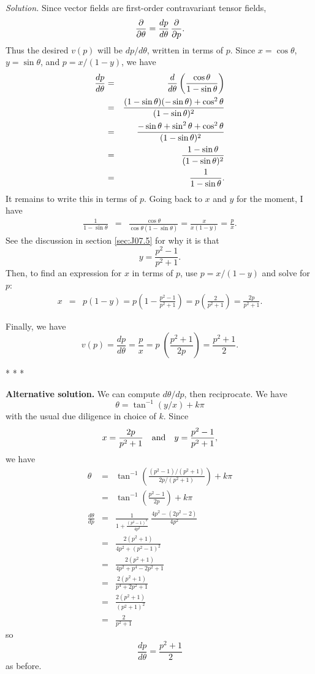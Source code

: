 \documentclass[10pt]{article}
\numberwithin{equation}{subsection}
\begin{document}
\emph{Solution.}  Since vector fields are first-order contravariant tensor
fields,
$$
	\frac{\partial}{\partial \theta} = \frac{dp}{d\theta} \, \frac{\partial}{\partial p}.
$$
Thus the desired $v(p)$ will be $dp/d\theta$, written in terms of $p$.
Since $x=\cos\theta$, $y=\sin\theta$, and $p=x/(1-y)$, we have
\begin{eqnarray*}
	\frac{dp}{d\theta}
	&=& \frac{d}{d\theta}\left(\frac{\cos\theta}{1-\sin\theta}\right) \\
	&=& \frac{(1-\sin\theta)(-\sin\theta) + \cos^2\theta}{(1-\sin\theta)^2} \\
	&=& \frac{-\sin\theta + \sin^2\theta + \cos^2\theta}{(1-\sin\theta)^2} \\
	&=& \frac{1-\sin\theta}{(1-\sin\theta)^2} \\
	&=& \frac{1}{1-\sin\theta}.
\end{eqnarray*}
It remains to write this in terms of $p$.  Going back to $x$ and $y$ for
the moment, I have
\begin{eqnarray*}
	\frac{1}{1-\sin\theta}
	&=& \frac{\cos\theta}{\cos\theta(1-\sin\theta)}
	= \frac{x}{x(1-y)}
	= \frac{p}{x}.
\end{eqnarray*}
See the discussion in section \ref{sec:J07.5} for why it is that
$$
	y = \frac{p^2-1}{p^2+1}.
$$
Then, to find an expression for $x$ in terms of $p$, use 
$p=x/(1-y)$ and solve for $p$:
\begin{eqnarray*}
	x &=& p(1 - y)
	= p\left(1 - \frac{p^2-1}{p^2+1}\right)
	= p\left(\frac{2}{p^2+1}\right)
	= \frac{2p}{p^2+1}.
\end{eqnarray*}

Finally, we have
$$
	v(p) = \frac{dp}{d\theta} = \frac{p}{x}
	= p\; \left(\frac {p^2+1}{2p}\right)
	= \frac {p^2+1}{2}.
$$

\begin{center}* * *\end{center}

\textbf{Alternative solution.}  We can compute $d\theta/dp$, then reciprocate.
We have
$$
	\theta = \tan^{-1}(y/x)+k\pi
$$
with the usual due diligence in choice of $k$.  Since
$$
	x=\frac{2p}{p^2+1} \quad\textrm{and}\quad
	y=\frac{p^2-1}{p^2+1},
$$
we have
\begin{eqnarray*}
	\theta &=& \tan^{-1}\left(\frac{(p^2-1)/(p^2+1)}{2p/(p^2+1)}\right)+k\pi \\
	&=& \tan^{-1}\left(\frac{p^2-1}{2p}\right)+k\pi \\
	\frac{d\theta}{dp} &=&
		\frac{1}{1+\frac{(p^2-1)^2}{4p^2}} \;
		\frac{4p^2-(2p^2-2)}{4p^2} \\
	&=& \frac{2(p^2+1)}{4p^2+(p^2-1)^2} \\
	&=& \frac{2(p^2+1)}{4p^2+p^4-2p^2+1} \\
	&=& \frac{2(p^2+1)}{p^4+2p^2+1} \\
	&=& \frac{2(p^2+1)}{(p^2+1)^2} \\
	&=& \frac{2}{p^2+1}
\end{eqnarray*}
so
$$
	\frac{dp}{d\theta} = \frac {p^2+1}{2}
$$
as before.
\end{document}
